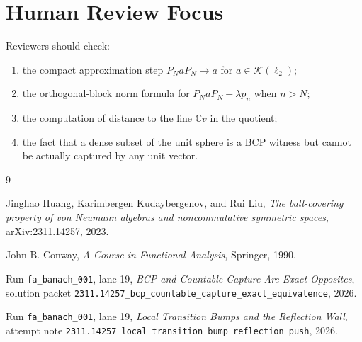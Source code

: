 \documentclass[11pt]{article}
\newcommand{\C}{\mathbb C}
\newcommand{\Kcal}{\mathcal K}
\begin{document}
\section*{Human Review Focus}

Reviewers should check:
\begin{enumerate}
    \item the compact approximation step
          \(P_NaP_N\to a\) for \(a\in\Kcal(\ell_2)\);
    \item the orthogonal-block norm formula for
          \(P_NaP_N-\lambda p_n\) when \(n>N\);
    \item the computation of distance to the line \(\C v\) in the quotient;
    \item the fact that a dense subset of the unit sphere is a BCP witness
          but cannot be actually captured by any unit vector.
\end{enumerate}

\begin{thebibliography}{9}

Jinghao Huang, Karimbergen Kudaybergenov, and Rui Liu,
\emph{The ball-covering property of von Neumann algebras and noncommutative
symmetric spaces},
arXiv:2311.14257, 2023.

John B. Conway,
\emph{A Course in Functional Analysis},
Springer, 1990.

Run \texttt{fa\_banach\_001}, lane 19,
\emph{BCP and Countable Capture Are Exact Opposites},
solution packet
\texttt{2311.14257\_bcp\_countable\_capture\_exact\_equivalence}, 2026.

Run \texttt{fa\_banach\_001}, lane 19,
\emph{Local Transition Bumps and the Reflection Wall},
attempt note
\texttt{2311.14257\_local\_transition\_bump\_reflection\_push}, 2026.

\end{thebibliography}
\end{document}
